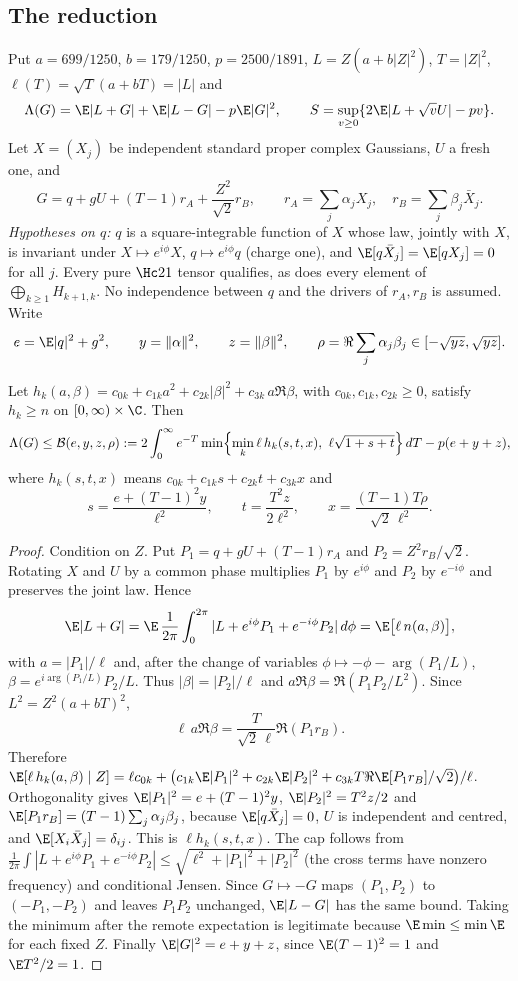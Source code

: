\subsection{The reduction}
\label{sec:cm-reduction}
Put $a=699/1250$, $b=179/1250$, $p=2500/1891$, $L=Z(a+b|Z|^2)$, $T=|Z|^2$, $\ell(T)=\sqrt T(a+bT)=|L|$ and
\[
 \Lambda(G)=\E|L+G|+\E|L-G|-p\E|G|^2,\qquad S=\sup_{v\ge0}\{2\E|L+\sqrt vU|-pv\}.
\]
Let $X=(X_j)$ be independent standard proper complex Gaussians, $U$ a fresh one, and
\[
 G=q+gU+(T-1)r_A+\frac{Z^2}{\sqrt2}r_B,\qquad r_A=\sum_j\alpha_jX_j,\quad r_B=\sum_j\beta_j\bar X_j. \tag{CM.1}
\]
\emph{Hypotheses on $q$:} $q$ is a square-integrable function of $X$ whose law, jointly with $X$, is invariant under $X\mapsto e^{i\phi}X$, $q\mapsto e^{i\phi}q$
(charge one), and $\E[q\bar X_j]=\E[qX_j]=0$ for all $j$. Every pure $\Hc21$ tensor qualifies, as does every element of $\bigoplus_{k\ge1}H_{k+1,k}$.
No independence between $q$ and the drivers of $r_A,r_B$ is assumed. Write
\[
 e=\E|q|^2+g^2,\qquad y=\|\alpha\|^2,\qquad z=\|\beta\|^2,\qquad \rho=\Re\sum_j\alpha_j\beta_j\in[-\sqrt{yz},\sqrt{yz}].
\]

\begin{lemma}\label{lem:cm-bound}
Let $h_k(a,\beta)=c_{0k}+c_{1k}a^2+c_{2k}|\beta|^2+c_{3k}\,a\Re\beta$, with $c_{0k},c_{1k},c_{2k}\ge0$, satisfy $h_k\ge n$ on $[0,\infty)\times\C$. Then
\[
 \Lambda(G)\le\mathcal B(e,y,z,\rho):=2\int_0^\infty e^{-T}\min\Bigl\{\min_k\ell\,h_k(s,t,x),\ \ell\sqrt{1+s+t}\Bigr\}\,dT-p(e+y+z),
\]
where $h_k(s,t,x)$ means $c_{0k}+c_{1k}s+c_{2k}t+c_{3k}x$ and
\[
 s=\frac{e+(T-1)^2y}{\ell^2},\qquad t=\frac{T^2z}{2\ell^2},\qquad x=\frac{(T-1)T\rho}{\sqrt2\,\ell^2}.
\]
\end{lemma}
\begin{proof}
Condition on $Z$. Put $P_1=q+gU+(T-1)r_A$ and $P_2=Z^2r_B/\sqrt2$. Rotating $X$ and $U$ by a common phase multiplies $P_1$ by $e^{i\phi}$ and $P_2$ by
$e^{-i\phi}$ and preserves the joint law. Hence
\[
 \E|L+G|=\E\,\frac1{2\pi}\int_0^{2\pi}|L+e^{i\phi}P_1+e^{-i\phi}P_2|\,d\phi=\E\bigl[\ell\,n(a,\beta)\bigr],
\]
with $a=|P_1|/\ell$ and, after the change of variables $\phi\mapsto-\phi-\arg(P_1/L)$, $\beta=e^{i\arg(P_1/L)}P_2/L$. Thus $|\beta|=|P_2|/\ell$ and
$a\Re\beta=\Re(P_1P_2/L^2)$. Since $L^2=Z^2(a+bT)^2$,
\[
 \ell\,a\Re\beta=\frac{T}{\sqrt2\,\ell}\Re(P_1r_B).
\]
Therefore $\E[\ell\,h_k(a,\beta)\mid Z]=\ell c_{0k}+\bigl(c_{1k}\E|P_1|^2+c_{2k}\E|P_2|^2+c_{3k}T\Re\E[P_1r_B]/\sqrt2\bigr)/\ell$.
Orthogonality gives $\E|P_1|^2=e+(T-1)^2y$, $\E|P_2|^2=T^2z/2$ and $\E[P_1r_B]=(T-1)\sum_j\alpha_j\beta_j$, because
$\E[q\bar X_j]=0$, $U$ is independent and centred, and $\E[X_i\bar X_j]=\delta_{ij}$. This is $\ell h_k(s,t,x)$. The cap follows from
$\frac1{2\pi}\int|L+e^{i\phi}P_1+e^{-i\phi}P_2|\le\sqrt{\ell^2+|P_1|^2+|P_2|^2}$ (the cross terms have nonzero frequency) and conditional Jensen.
Since $G\mapsto-G$ maps $(P_1,P_2)$ to $(-P_1,-P_2)$ and leaves $P_1P_2$ unchanged, $\E|L-G|$ has the same bound. Taking the minimum after the remote
expectation is legitimate because $\E\min\le\min\E$ for each fixed $Z$. Finally $\E|G|^2=e+y+z$, since $\E(T-1)^2=1$ and $\E T^2/2=1$.
\end{proof}


